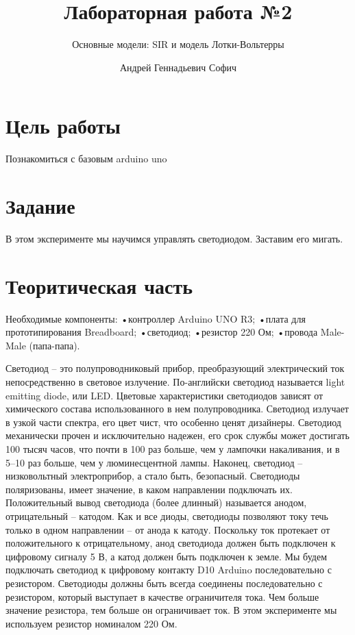 \documentclass[
  english,
  russian,
  12pt,
  a4paper,
  DIV=11,
  numbers=noendperiod]{scrreprt}
\title{Лабораторная работа №2}
\subtitle{Основные модели: SIR и модель Лотки-Вольтерры}
\author{Андрей Геннадьевич Софич}
\date{}
\renewcommand*\contentsname{Содержание}
\newcommand\contentsname{Содержание}
\begin{document}
\maketitle

\renewcommand*\contentsname{Содержание}
{
\setcounter{tocdepth}{1}
\tableofcontents
}
\listoffigures
\listoftables

\chapter{Цель
работы}\label{ux446ux435ux43bux44c-ux440ux430ux431ux43eux442ux44b}

Познакомиться с базовым arduino uno

\chapter{Задание}\label{ux437ux430ux434ux430ux43dux438ux435}

В этом эксперименте мы научимся управлять светодиодом. Заставим его
мигать.

\chapter{Теоритическая
часть}\label{ux442ux435ux43eux440ux438ux442ux438ux447ux435ux441ux43aux430ux44f-ux447ux430ux441ux442ux44c}

Необходимые компоненты: •контроллер Arduino UNO R3; •плата для
прототипирования Breadboard; •светодиод; •резистор 220 Ом; •провода
Male-Male (папа-папа).

Светодиод -- это полупроводниковый прибор, преобразующий электрический
ток непосредственно в световое излучение. По-английски светодиод
называется light emitting diode, или LED. Цветовые характеристики
светодиодов зависят от химического состава использованного в нем
полупроводника. Светодиод излучает в узкой части спектра, его цвет чист,
что особенно ценят дизайнеры. Светодиод механически прочен и
исключительно надежен, его срок службы может достигать 100 тысяч часов,
что почти в 100 раз больше, чем у лампочки накаливания, и в 5--10 раз
больше, чем у люминесцентной лампы. Наконец, светодиод -- низковольтный
электроприбор, а стало быть, безопасный. Светодиоды поляризованы, имеет
значение, в каком направлении подключать их. Положительный вывод
светодиода (более длинный) называется анодом, отрицательный -- катодом.
Как и все диоды, светодиоды позволяют току течь только в одном
направлении -- от анода к катоду. Поскольку ток протекает от
положительного к отрицательному, анод светодиода должен быть подключен к
цифровому сигналу 5 В, а катод должен быть подключен к земле. Мы будем
подключать светодиод к цифровому контакту D10 Arduino последовательно с
резистором. Светодиоды должны быть всегда соединены последовательно с
резистором, который выступает в качестве ограничителя тока. Чем больше
значение резистора, тем больше он ограничивает ток. В этом эксперименте
мы используем резистор номиналом 220 Ом.
\end{document}
